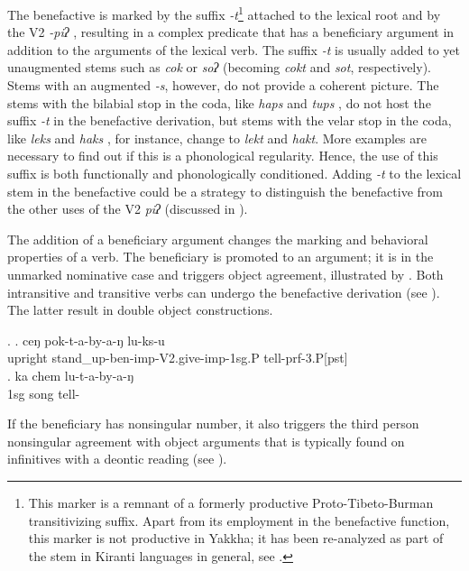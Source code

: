 The benefactive is marked by the suffix \emph{-t}\footnote{This marker is a remnant of a  formerly productive Proto-Tibeto-Burman  transitivizing suffix. Apart from its employment in the benefactive function, this marker is not productive in Yakkha; it has been re-analyzed as part of the stem in Kiranti languages in general, see .} attached to the lexical root and by the V2 \emph{-piʔ} , resulting in a complex predicate that has a beneficiary argument in addition to the arguments of the lexical verb. The suffix \emph{-t} is usually added to yet unaugmented stems such as \emph{cok}  or \emph{soʔ}  (becoming \emph{cokt} and \emph{sot}, respectively). Stems with an augmented \emph{-s}, however, do not provide a coherent picture. The stems with the bilabial stop in the coda, like \emph{haps}  and \emph{tups} , do not host the suffix \emph{-t} in the benefactive derivation, but stems with the velar stop in the coda, like \emph{leks}  and \emph{haks} , for instance, change to \emph{lekt} and \emph{hakt}. More examples are necessary to find out if this is a phonological regularity. Hence, the use of this suffix is both functionally and phonologically conditioned. Adding \emph{-t} to the lexical stem in the benefactive could be a strategy to distinguish the benefactive from the other uses of the V2 \emph{piʔ} (discussed in ).

The addition of  a beneficiary argument changes the marking and behavioral properties of a verb. The beneficiary is promoted to an argument; it is in the unmarked nominative case and triggers object agreement, illustrated by \Next. Both intransitive and transitive verbs can undergo the benefactive derivation (see \Next). The latter result in double object constructions.  

 \ex. \ag. ceŋ    pok-t-a-by-a-ŋ lu-ks-u\\
upright stand\_up-{\sc ben-imp-V2.give-imp-1sg.P} tell{\sc -prf-3.P[pst]}\\
 
 \bg. ka chem lu-t-a-by-a-ŋ\\
 {\sc 1sg} song tell-\\
 
 If the beneficiary has nonsingular number, it also triggers the third person nonsingular agreement with object arguments that is typically found  on infinitives with a deontic reading (see ).

